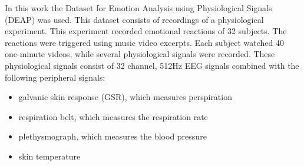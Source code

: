 \npar

In this work the Dataset for Emotion Analysis using Physiological Signals (DEAP)\cite{DEAP} was used. This dataset consists of recordings of a physiological experiment. This experiment recorded emotional reactions of 32 subjects. The reactions were triggered using music video excerpts. Each subject watched 40 one-minute videos, while several physiological signals were recorded. These physiological signals consist of 32 channel, 512Hz EEG signals combined with the following peripheral signals:
\begin{itemize}
\item galvanic skin response (GSR), which measures perspiration
\item respiration belt, which measures the respiration rate
\item plethysmograph, which measures the blood pressure
\item skin temperature
\end{itemize}

\npar



